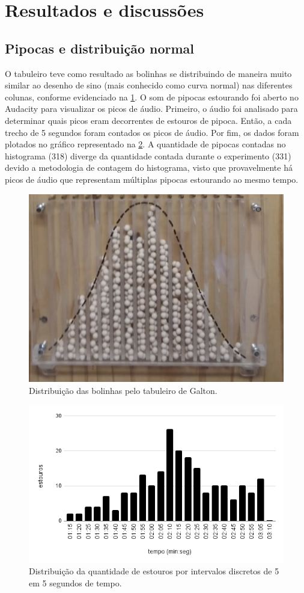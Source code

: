 \section{Resultados e discussões}

\subsection{Pipocas e distribuição normal}
O tabuleiro teve como resultado as bolinhas se distribuindo de maneira muito similar ao desenho de sino (mais conhecido como curva normal) nas diferentes colunas, conforme evidenciado na \cref{distbolinha}. O som de pipocas estourando foi aberto no Audacity para visualizar os picos de áudio. Primeiro, o áudio foi analisado para determinar quais picos eram decorrentes de estouros de pipoca. Então, a cada trecho de 5 segundos foram contados os picos de áudio. Por fim, os dados foram plotados no gráfico representado na \cref{estouros}. A quantidade de pipocas contadas no histograma (318) diverge da quantidade contada durante o experimento (331) devido a metodologia de contagem do histograma, visto que provavelmente há picos de áudio que representam múltiplas pipocas estourando ao mesmo tempo. 

\begin{figure}[H]
    \centering
    \includegraphics[width=.5\linewidth]{fig/DistNorm}
    \caption{Distribuição das bolinhas pelo tabuleiro de Galton.}\label{distbolinha}
\end{figure}
\begin{figure}[H]
    \centering
    \includegraphics[width=.5\linewidth]{fig/distEstouros}
    \caption{Distribuição da quantidade de estouros por intervalos discretos de 5 em 5 segundos de tempo.}\label{estouros}
\end{figure}


